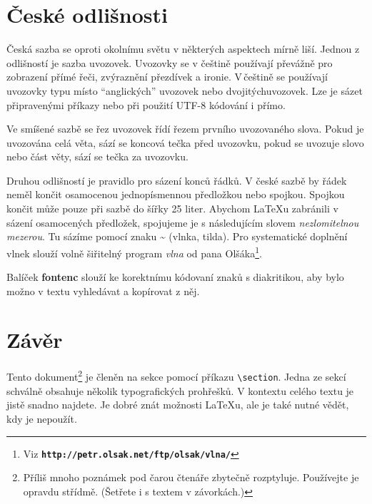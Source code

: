 \documentclass[a4paper, twocolumn, 10pt]{article}
\begin{document}
\section{České odlišnosti}
Česká sazba se oproti okolnímu světu v některých aspektech mírně liší. Jednou z odlišností je sazba uvozovek. Uvozovky se v češtině používají převážně pro zobrazení přímé řeči, zvýraznění přezdívek a ironie. V\,češtině se používají uvozovky typu  místo “anglických” uvozovek nebo \textquotedbl dvojitých\textquotedbl uvozovek. Lze je sázet připravenými příkazy nebo při použití UTF-8 kódování i přímo.

Ve smíšené sazbě se řez uvozovek řídí řezem prvního uvozovaného slova. Pokud je uvozována celá věta, sází se koncová tečka před uvozovku, pokud se uvozuje slovo nebo část věty, sází se tečka za uvozovku.

Druhou odlišností je pravidlo pro sázení konců řádků. V české sazbě by řádek neměl končit osamocenou jednopísmennou předložkou nebo spojkou. Spojkou  končit může pouze při sazbě do šířky 25 liter. Abychom \LaTeX u zabránili v sázení osamocených předložek, spojujeme je s následujícím slovem \emph{nezlomitelnou mezerou}. Tu sázíme pomocí znaku \~{} (vlnka, tilda). Pro systematické doplnění vlnek slouží volně šiřitelný program \emph{vlna} od pana Olšáka\footnote{Viz \textbf{\nolinkurl{http://petr.olsak.net/ftp/olsak/vlna/}}}.

Balíček \textbf{fontenc} slouží ke korektnímu kódovaní znaků s diakritikou, aby bylo možno v textu vyhledávat a kopírovat z něj.

\section{Závěr}
Tento dokument\footnote{Příliš mnoho poznámek pod čarou čtenáře zbytečně rozptyluje. Používejte je opravdu střídmě. (Šetřete i s textem v závorkách.)} je členěn na sekce pomocí příkazu \verb|\section|. Jedna ze sekcí schválně obsahuje několik typografických prohřešků. V kontextu celého textu je jistě snadno najdete. Je dobré znát možnosti \LaTeX u, ale je také nutné vědět, kdy je nepoužít.
\end{document}
